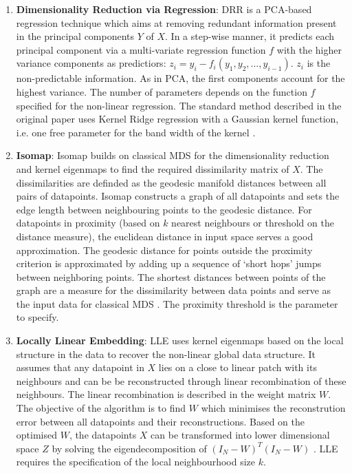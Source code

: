 \begin{enumerate}
\item\textbf{Dimensionality Reduction via Regression}: DRR is a PCA-based regression technique which aims at removing redundant information present in the principal components \(Y\) of \(X\). In a step-wise manner, it predicts each principal component via a multi-variate regression function \(f\) with the higher variance components as predictiors: \(z_i = y_i - f_i(y_1, y_2, \dots , y_{i-1})\). \(z_i\) is the non-predictable information. As in PCA, the first components account for the highest variance. The number of parameters depends on the function \(f\) specified for the non-linear regression. The standard method described in the original paper uses Kernel Ridge regression with a Gaussian kernel function, i.e. one free parameter for the band width of the kernel \citep{Laparra2015}. 

\item\textbf{Isomap}: Isomap builds on classical MDS for the dimensionality reduction and kernel eigenmaps to find the required dissimilarity matrix of \(X\). The dissimilarities are definded as the geodesic manifold distances between all pairs of datapoints. Isomap constructs a graph of all datapoints and sets the edge length between neighbouring points to the geodesic distance. For datapoints in proximity (based on \(k\) nearest neighbours or threshold on the distance measure), the euclidean distance in input space serves a good approximation. The geodesic distance for points outside the proximity criterion is approximated by adding up a sequence of `short hops' jumps  between neighboring points. The shortest distances between points of the graph are a measure for the dissimilarity between data points and serve as the input data for classical MDS \citep{Tenebaum2000}. The proximity threshold is the parameter to specify. 

\item\textbf{Locally Linear Embedding}: LLE uses kernel eigenmaps based on the local structure in the data to recover the non-linear global data structure. It assumes that any datapoint in \(X\) lies on a close to linear patch with its neighbours and can be be reconstructed through linear recombination of these neighbours. The linear recombination is described in the weight matrix \(W\). The objective of the algorithm is to find \(W\) which minimises the reconstrution error between all datapoints and their reconstructions. Based on the optimised \(W\), the datapoints \(X\) can be transformed into lower dimensional space \(Z\) by solving the eigendecomposition of \((I_N -W)^T(I_N -W)\) \citep{Roweis2000}. LLE requires the specification of the local neighbourhood size \(k\). 


\end{enumerate}
